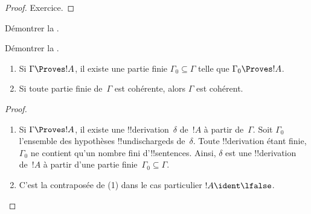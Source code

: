 \documentclass[../../../include/open-logic-section]{subfiles}
\begin{document}
\begin{proof}
Exercice.
\end{proof}

\begin{prob}
Démontrer la .
\end{prob}
\tagendprob

\begin{prob}
Démontrer la .
\end{prob}
\tagendprob

\begin{prop}[Compacité]
  \begin{enumerate}
  \item Si $\Gamma \Proves !A$, il existe une partie finie
    $\Gamma_0 \subseteq \Gamma$ telle que $\Gamma_0 \Proves !A$.
  \item Si toute partie finie de~$\Gamma$ est cohérente,
    alors $\Gamma$ est cohérent.
  \end{enumerate}
\end{prop}

\begin{proof}
  \begin{enumerate}
    \item Si $\Gamma \Proves !A$, il existe une
      !!{derivation}~$\delta$ de~$!A$ à partir de~$\Gamma$.
      Soit $\Gamma_0$ l'ensemble des hypothèses
      !!{undischarged}s de~$\delta$. Toute !!{derivation} étant
      finie, $\Gamma_0$ ne contient qu'un nombre fini
      d'!!{sentence}s. Ainsi, $\delta$ est une !!{derivation}
      de~$!A$ à partir d'une partie finie~$\Gamma_0 \subseteq \Gamma$.
    \item C'est la contraposée de (1) dans le cas particulier
      $!A \ident \lfalse$.
  \end{enumerate}
\end{proof}

%
%
%
%
%
%
\end{document}
